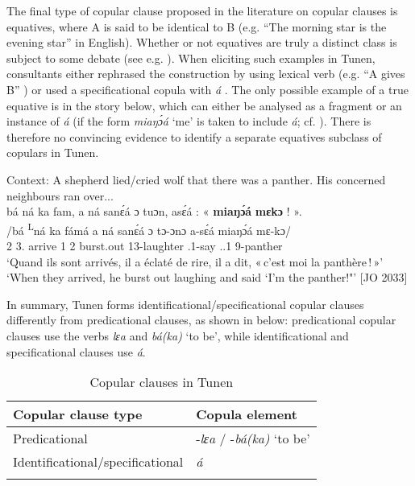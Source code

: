 \documentclass[output=paper,colorlinks,citecolor=brown
]{langscibook}
\begin{document}
 \z

The final type of copular clause proposed in the literature on copular clauses is equatives, where A is said to be identical to B (e.g. ``The morning star is the evening star'' in English). Whether or not equatives are truly a distinct class is subject to some debate (see e.g. \citealt{Heycock2012}). When eliciting such examples in Tunen, consultants either rephrased the construction by using lexical verb (e.g. ``A gives B'' ) or used a specificational copula with \textit{á} \COP{}. The only possible example of a true equative is in the story below, which can either be analysed as a fragment or an instance of \textit{á} \COP{} (if the form \textit{miaŋɔ́á} `me' is taken to include \textit{á}; cf. \citealt{Dugast1971}). There is therefore no convincing evidence to identify a separate  equatives subclass of copulars in Tunen.\largerpage[3]

\ea
Context: A shepherd lied/cried wolf that there was a panther. His concerned neighbours ran over... \\
\glll
{\db}bá \ds{}ná ka fam, a ná sanɛ́á ɔ tuɔn, {asɛ́á :} {« \textbf{miaŋɔ́á}} {\textbf{mɛkɔ} ! »}. \\
/bá \textsuperscript{L}ná ka fámá a ná sanɛ́á ɔ tɔ-ɔnɔ a-sɛ́á  {\db}miaŋɔ́á mɛ-kɔ/ \\
{\db}2\SM{} \PST{}3.\DEP{} \AND{} arrive 1\SM{} \PST{}2{} burst.out \PREP{} 13-laughter \SM{}.1-say { }\PRO{}.\EMPH{}.1\SG{} 9-panther \\
\glt
`Quand ils sont arrivés, il a éclaté de rire, il a dit, «\,c'est moi la panthère\,!\,»' \quad `When they arrived, he burst out laughing and said `I'm the panther!"' [JO 2033]


\z

In summary, Tunen forms identificational/specificational copular clauses differently from predicational clauses, as shown in  below: predicational copular clauses use the verbs \textit{lɛa} and \textit{bá(ka)} `to be', while identificational and specificational clauses use \textit{á}.

\begin{table}[ht]
\begin{tabularx}{0.75\textwidth}{Xl}
\lsptoprule
Copular clause type & Copula element \\
\midrule
Predicational & -\textit{lɛa} / -\textit{bá(ka)} `to be'\\
Identificational/specificational & \textit{á} \\
\lspbottomrule
\end{tabularx}
\caption{Copular clauses in Tunen}
\label{tbl1}
\end{table}
\end{document}
